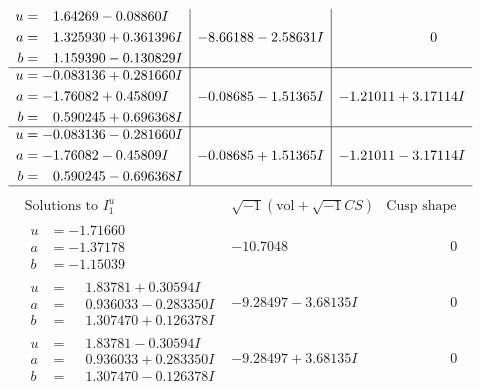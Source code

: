\documentclass[1p]{elsarticle_modified}
\theoremstyle{definition}
\newcommand{\I}{\sqrt{-1}}
\begin{document}
$$\begin{array}{c|c|c}
\begin{aligned}
u &= \phantom{-}1.64269 - 0.08860 I \\
a &= \phantom{-}1.325930 + 0.361396 I \\
b &= \phantom{-}1.159390 - 0.130829 I\end{aligned}
 & -8.66188 - 2.58631 I & \phantom{-0.000000 } 0 \\ \hline\begin{aligned}
u &= -0.083136 + 0.281660 I \\
a &= -1.76082 + 0.45809 I \\
b &= \phantom{-}0.590245 + 0.696368 I\end{aligned}
 & -0.08685 - 1.51365 I & -1.21011 + 3.17114 I \\ \hline\begin{aligned}
u &= -0.083136 - 0.281660 I \\
a &= -1.76082 - 0.45809 I \\
b &= \phantom{-}0.590245 - 0.696368 I\end{aligned}
 & -0.08685 + 1.51365 I & -1.21011 - 3.17114 I\\
 \hline 
 \end{array}$$\newpage$$\begin{array}{c|c|c}  
\text{Solutions to }I^u_{1}& \I (\text{vol} + \sqrt{-1}CS) & \text{Cusp shape}\\
 \hline 
\begin{aligned}
u &= -1.71660\phantom{ +0.000000I} \\
a &= -1.37178\phantom{ +0.000000I} \\
b &= -1.15039\phantom{ +0.000000I}\end{aligned}
 & -10.7048\phantom{ +0.000000I} & \phantom{-0.000000 } 0 \\ \hline\begin{aligned}
u &= \phantom{-}1.83781 + 0.30594 I \\
a &= \phantom{-}0.936033 - 0.283350 I \\
b &= \phantom{-}1.307470 + 0.126378 I\end{aligned}
 & -9.28497 - 3.68135 I & \phantom{-0.000000 } 0 \\ \hline\begin{aligned}
u &= \phantom{-}1.83781 - 0.30594 I \\
a &= \phantom{-}0.936033 + 0.283350 I \\
b &= \phantom{-}1.307470 - 0.126378 I\end{aligned}
 & -9.28497 + 3.68135 I & \phantom{-0.000000 } 0 \\ \hline\begin{aligned}

\end{aligned}
\end{array}$$
\end{document}
